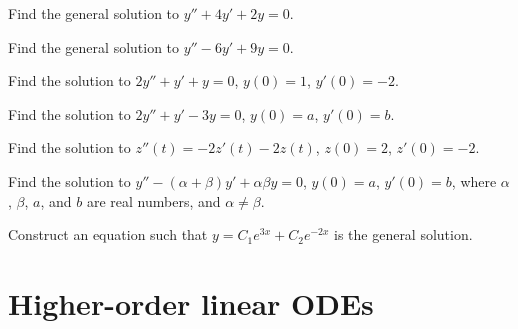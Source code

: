 \setcounter{exercise}{100}

\begin{exercise}
Find the general solution to
$y''+4y'+2y=0$.
\end{exercise}

\begin{exercise}
Find the general solution to
$y''-6y'+9y=0$.
\end{exercise}

\begin{exercise}
Find the solution to
$2y''+y'+y=0$, $y(0) = 1$, $y'(0)=-2$.
\end{exercise}

\begin{exercise}
Find the solution to
$2y''+y'-3y=0$, $y(0) = a$, $y'(0)=b$.
\end{exercise}

\begin{exercise}
Find the solution to
$z''(t) = -2z'(t)-2z(t)$, $z(0) = 2$, $z'(0)= -2$.
\end{exercise}

\begin{exercise}
Find the solution to
$y''-(\alpha+\beta) y' + \alpha \beta y=0$, $y(0) = a$, $y'(0)=b$,
where $\alpha$, $\beta$, $a$, and $b$ are real numbers, and $\alpha \not=
\beta$.
\end{exercise}

\begin{exercise}
Construct an equation such that $y = C_1 e^{3x} + C_2 e^{-2x}$ is the general
solution.
\end{exercise}


\sectionnewpage
\section{Higher-order linear ODEs} \label{sec:hol}


